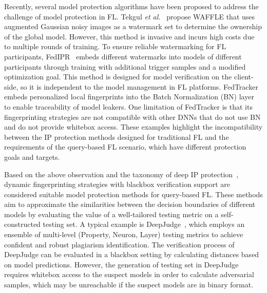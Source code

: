 Recently, several model protection algorithms have been proposed to address the challenge of model protection in FL. 
Tekgul \textit{et al.}~\cite{tekgul2021waffle} propose WAFFLE that uses augmented Gaussian noisy images as a watermark set to determine the ownership of the global model. 
However, this method is invasive and incurs high costs due to multiple rounds of training.
To ensure reliable watermarking for FL participants, FedIPR~\cite{li2023fedipr} embeds different watermarks into models of different participants through training with additional trigger samples and a modified optimization goal.
This method is designed for model verification on the client-side, so it is independent to the model management in FL platforms.
FedTracker~\cite{shao2022fedtracker} embeds personalized local fingerprints into the Batch Normalization (BN) layer to enable traceability of model leakers.
One limitation of FedTracker is that its fingerprinting strategies are not compatible with other DNNs that do not use BN and do not provide whitebox access.
These examples highlight the incompatibility between the IP protection methods designed for traditional FL and the requirements of the query-based FL scenario, which have different protection goals and targets.

Based on the above observation and the taxonomy of deep IP protection~\cite{peng2022intellectual, sun2023deep}, dynamic fingerprinting strategies with blackbox verification support are considered suitable model protection methods for query-based FL.
These methods aim to approximate the similarities between the decision boundaries of different models by evaluating the value of a well-tailored testing metric on a self-constructed testing set.
A typical example is DeepJudge~\cite{chen2022copy}, which employs an ensemble of multi-level (Property, Neuron, Layer) testing metrics to achieve confident and robust plagiarism identification. 
The verification process of DeepJudge can be evaluated in a blackbox setting by calculating distances based on model predictions.
However, the generation of testing set in DeepJudge requires whitebox access to the suspect models in order to calculate adversarial samples, which may be unreachable if the suspect models are in binary format.

